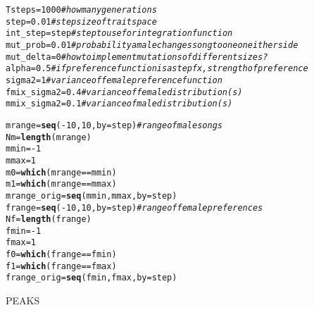 \documentclass{article}\usepackage[]{graphicx}\usepackage[]{color}
\makeatletter
\newcommand{\hlnum}[1]{\textcolor[rgb]{0.686,0.059,0.569}{#1}}%
\newcommand{\hlcom}[1]{\textcolor[rgb]{0.678,0.584,0.686}{\textit{#1}}}%
\newcommand{\hlopt}[1]{\textcolor[rgb]{0,0,0}{#1}}%
\newcommand{\hlstd}[1]{\textcolor[rgb]{0.345,0.345,0.345}{#1}}%
\newcommand{\hlkwb}[1]{\textcolor[rgb]{0.69,0.353,0.396}{#1}}%
\newcommand{\hlkwc}[1]{\textcolor[rgb]{0.333,0.667,0.333}{#1}}%
\newcommand{\hlkwd}[1]{\textcolor[rgb]{0.737,0.353,0.396}{\textbf{#1}}}%
\newenvironment{kframe}{%
 \def\at@end@of@kframe{}%
 \ifinner\ifhmode%
  \def\at@end@of@kframe{\end{minipage}}%
  \begin{minipage}{\columnwidth}%
 \fi\fi%
 \def\FrameCommand##1{\hskip\@totalleftmargin \hskip-\fboxsep
 \colorbox{shadecolor}{##1}\hskip-\fboxsep
     \hskip-\linewidth \hskip-\@totalleftmargin \hskip\columnwidth}%
 \MakeFramed {\advance\hsize-\width
   \@totalleftmargin\z@ \linewidth\hsize
   \@setminipage}}%
 {\par\unskip\endMakeFramed%
 \at@end@of@kframe}
\newenvironment{knitrout}{}{} %
\makeatother
\begin{document}
\begin{knitrout}
\color{fgcolor}\begin{kframe}
\begin{alltt}
\hlstd{Tsteps} \hlkwb{=} \hlnum{1000} \hlcom{#how many generations}
\hlstd{step} \hlkwb{=} \hlnum{0.01} \hlcom{#step size of trait space}
\hlstd{int_step} \hlkwb{=} \hlstd{step} \hlcom{#step to use for integration function}
\hlstd{mut_prob} \hlkwb{=} \hlnum{0.01} \hlcom{#probability a male changes song to one on either side}
\hlstd{mut_delta} \hlkwb{=} \hlnum{0} \hlcom{#how to implement mutations of different sizes?}
\hlstd{alpha} \hlkwb{=} \hlnum{0.5} \hlcom{#if preference function is a step fx, strength of preference}
\hlstd{sigma2} \hlkwb{=} \hlnum{1} \hlcom{#variance of female preference function}
\hlstd{fmix_sigma2} \hlkwb{=} \hlnum{0.4} \hlcom{#variance of female distribution(s)}
\hlstd{mmix_sigma2} \hlkwb{=} \hlnum{0.1} \hlcom{#variance of male distribution(s)}

\hlstd{mrange} \hlkwb{=} \hlkwd{seq}\hlstd{(}\hlopt{-}\hlnum{10}\hlstd{,}\hlnum{10}\hlstd{,}\hlkwc{by}\hlstd{=step)} \hlcom{#range of male songs}
\hlstd{Nm} \hlkwb{=} \hlkwd{length}\hlstd{(mrange)}
\hlstd{mmin} \hlkwb{=} \hlopt{-}\hlnum{1}
\hlstd{mmax} \hlkwb{=} \hlnum{1}
\hlstd{m0} \hlkwb{=} \hlkwd{which}\hlstd{(mrange}\hlopt{==}\hlstd{mmin)}
\hlstd{m1} \hlkwb{=} \hlkwd{which}\hlstd{(mrange}\hlopt{==}\hlstd{mmax)}
\hlstd{mrange_orig} \hlkwb{=} \hlkwd{seq}\hlstd{(mmin,mmax,}\hlkwc{by}\hlstd{=step)}
\hlstd{frange} \hlkwb{=} \hlkwd{seq}\hlstd{(}\hlopt{-}\hlnum{10}\hlstd{,}\hlnum{10}\hlstd{,}\hlkwc{by}\hlstd{=step)} \hlcom{#range of female preferences}
\hlstd{Nf} \hlkwb{=} \hlkwd{length}\hlstd{(frange)}
\hlstd{fmin} \hlkwb{=} \hlopt{-}\hlnum{1}
\hlstd{fmax} \hlkwb{=} \hlnum{1}
\hlstd{f0} \hlkwb{=} \hlkwd{which}\hlstd{(frange}\hlopt{==}\hlstd{fmin)}
\hlstd{f1} \hlkwb{=} \hlkwd{which}\hlstd{(frange}\hlopt{==}\hlstd{fmax)}
\hlstd{frange_orig} \hlkwb{=} \hlkwd{seq}\hlstd{(fmin,fmax,}\hlkwc{by}\hlstd{=step)}
\end{alltt}
\end{kframe}
\end{knitrout}



PEAKS
\end{document}
